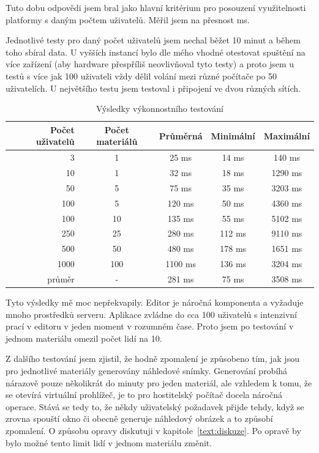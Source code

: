 Tuto dobu odpovědi jsem bral jako hlavní kritérium pro posouzení využitelnosti platformy s daným počtem uživatelů.
Měřil jsem na přesnost ms.

Jednotlivé testy pro daný počet uživatelů jsem nechal běžet 10 minut a během toho sbíral data.
U vyšších instancí bylo dle mého vhodné otestovat spuštění na více zařízení (aby hardware přespříliš neovlivňoval tyto testy) a proto jsem u testů s více jak 100 uživateli vždy dělil volání mezi různé počítače po 50 uživatelích.
U největšího testu jsem testoval i připojení ve dvou různých sítích.

\begin{table}[ht!]
    \caption{Výsledky výkonnostního testování}\label{tab:vysledkyTestovani}
    \centering
    \begin{tabular}{r|c|c|c|c}
        Počet uživatelů & Počet materiálů & Průměrná & Minimální & Maximální\\\hline\hline
        3 & 1 & 25 ms & 14 ms & 140 ms \\\hline
        10 & 1 & 32 ms & 18 ms & 1290 ms \\\hline
        50 & 5 & 75 ms & 35 ms & 3203 ms \\\hline
        100 & 5 & 120 ms & 50 ms & 4360 ms \\\hline
        100 & 10 & 135 ms & 55 ms & 5102 ms \\\hline
        250 & 25 & 280 ms & 112 ms & 9110 ms \\\hline
        500 & 50 & 480 ms & 178 ms & 1651 ms \\\hline
        1000 & 100 & 1100 ms & 136 ms & 3204 ms \\\hline\hline
        průměr & - & 281 ms & 75 ms & 3508 ms
    \end{tabular}
\end{table}

Tyto výsledky mě moc nepřekvapily.
Editor je náročná komponenta a vyžaduje mnoho prostředků serveru.
Aplikace zvládne do cca 100 uživatelů s intenzivní prací v editoru v jeden moment v rozumném čase.
Proto jsem po testování v jednom materiálu omezil počet lidí na 10.

Z dalšího testování jsem zjistil, že hodně zpomalení je způsobeno tím, jak jsou pro jednotlivé materiály generovány náhledové snímky.
Generování probíhá nárazově pouze několikrát do minuty pro jeden materiál, ale vzhledem k tomu, že se otevírá virtuální prohlížeč, je to pro hostitelský počítač docela náročná operace.
Stává se tedy to, že někdy uživatelský požadavek přijde tehdy, když se zrovna spouští okno či obecně generuje náhledový obrázek a to způsobí zpomalení.
O způsobu opravy diskutuji v kapitole~\ref{text:diskuze}.
Po opravě by bylo možné tento limit lidí v jednom materiálu změnit.

